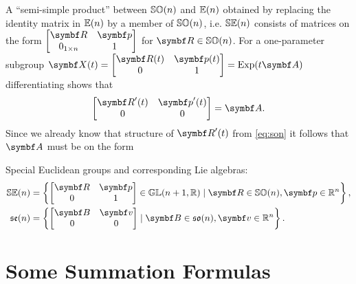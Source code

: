 A ``semi-simple product'' between ${\mathbb{SO}(n)}$ and ${\mathbb{E}(n)}$ obtained by replacing the identity matrix in ${\mathbb{E}(n)}$ by a member of ${\mathbb{SO}(n)}$, i.e. ${\mathbb{SE}(n)}$ consists of matrices on the form $ \begin{bmatrix} \bR & \bp \\ 0_{1 \times n} & 1 \end{bmatrix} $ for $\bR \in \SOn$. For a one-parameter subgroup $\X(t) = \begin{bmatrix} \bR(t) & \bp(t) \\ 0 & 1 \end{bmatrix} = \Exp(t \A)$ differentiating shows that
\begin{equation}
  \begin{bmatrix} \bR'(t) & \bp'(t) \\ 0 & 0 \end{bmatrix} = \A.
\end{equation}
Since we already know that structure of $\bR'(t)$ from \eqref{eq:son} it follows that $\A$ must be on the form
\begin{important}
  Special Euclidean groups and corresponding Lie algebras:
  \begin{subequations}
    \begin{align}
      \SEn & = \left\{\begin{bmatrix} \bR & \bp \\ 0 & 1 \end{bmatrix} \in \GL(n+1, \mathbb{R}) \mid \bR \in \SOn, \bp \in \mathbb{R}^{n} \right\}, \\
      \sen & = \left\{\begin{bmatrix} \B & \bv \\ 0 & 0 \end{bmatrix} \mid \B \in \son, \bv \in \mathbb{R}^{n} \right\}.
    \end{align}
  \end{subequations}
\end{important}

\section{Some Summation Formulas}

